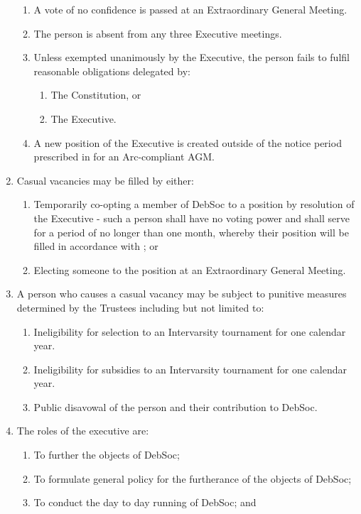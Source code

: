 \begin{enumerate}
\begin{enumerate}
  \item A vote of no confidence is passed at an Extraordinary General Meeting.
  \item The person is absent from any three Executive meetings.
  \item Unless exempted unanimously by the Executive, the person fails to fulfil reasonable obligations delegated by:
    \begin{enumerate}
    \item The Constitution, or
    \item The Executive.
    \end{enumerate}
  \item A new position of the Executive is created outside of the notice period prescribed in  for an Arc-compliant AGM.
  \end{enumerate}
\item Casual vacancies may be filled by either:
  \begin{enumerate}
  \item Temporarily co-opting a member of DebSoc to a position by resolution of the Executive - such a person shall have no voting power and shall serve for a period of no longer than one month, whereby their position will be filled in accordance with ; or
  \item Electing someone to the position at an Extraordinary General Meeting. \label{vacancy_egm}
  \end{enumerate}
\item A person who causes a casual vacancy may be subject to punitive measures determined by the Trustees including but not limited to:
  \begin{enumerate}
  \item Ineligibility for selection to an Intervarsity tournament for one calendar year.
  \item Ineligibility for subsidies to an Intervarsity tournament for one calendar year.
  \item Public disavowal of the person and their contribution to DebSoc.
  \end{enumerate}
\item The roles of the executive are:
  \begin{enumerate}
  \item To further the objects of DebSoc;
  \item To formulate general policy for the furtherance of the objects of DebSoc;
  \item To conduct the day to day running of DebSoc; and

\end{enumerate}
\end{enumerate}
